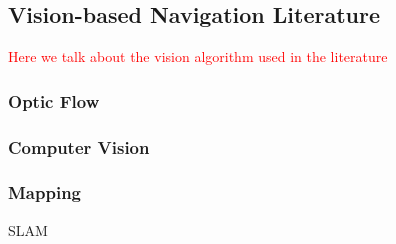 \subsection{Vision-based Navigation Literature}
\label{subsec:lit_vision}
\textcolor{red}{Here we talk about the vision algorithm used in the literature}
\subsubsection{Optic Flow}
\subsubsection{Computer Vision}
\subsubsection{Mapping} SLAM

